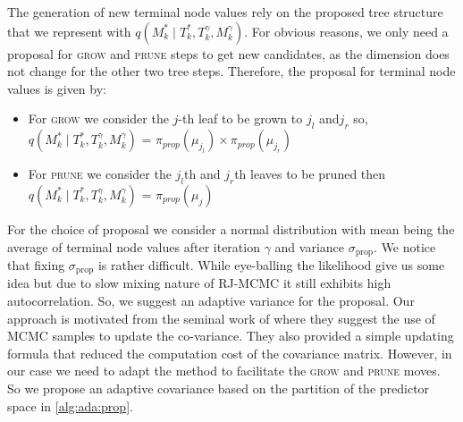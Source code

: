 \documentclass{amsart}
\begin{document}
The generation of new terminal node values rely on the proposed tree structure that we represent with $q\left(M_k^\ast\mid T_k^\ast, T_k^{\gamma}, M_k^{\gamma}\right)$. For obvious reasons, we only need a proposal for \textsc{grow} and \textsc{prune} steps to get new candidates, as the dimension does not change for the other two tree steps. Therefore, the proposal for terminal node values is given by:
\begin{itemize}
	\item For \textsc{grow} we consider the $j$-th leaf to be grown to $j_l$ and$j_r$ so,
	$q\left(M_k^\ast\mid T_k^\ast, T_k^{\gamma}, M_k^{\gamma}\right)$ = $\pi_{prop}(\mu_{j_l})\times\pi_{prop}(\mu_{j_r})$
	\item For \textsc{prune} we consider the $j_l$th and $j_r$th leaves to be pruned then $q\left(M_k^\ast\mid T_k^\ast, T_k^{\gamma}, M_k^{\gamma}\right)$ = $\pi_{prop}(\mu_j)$
\end{itemize}
For the choice of proposal we consider a normal distribution with mean being the average of terminal node values after iteration $\gamma$ and variance $\sigma_{\text{prop}}$. We notice that fixing $\sigma_{\text{prop}}$ is rather difficult. While eye-balling the likelihood give us some idea but due to slow mixing nature of RJ-MCMC it still exhibits high autocorrelation. So, we suggest an adaptive variance for the proposal. Our approach is motivated from the seminal work of \citet{haario_AMH} where they suggest the use of MCMC samples to update the co-variance. They also provided a simple updating formula that reduced the computation cost of the covariance matrix. However, in our case we need to adapt the method to facilitate the \textsc{grow} and \textsc{prune} moves. So we propose an adaptive covariance based on the partition of the predictor space in \cref{alg:ada:prop}.
\end{document}
